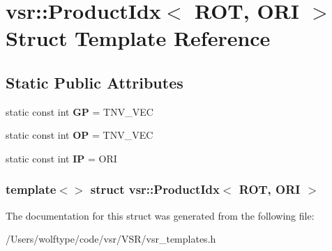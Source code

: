 \hypertarget{structvsr_1_1_product_idx_3_01_r_o_t_00_01_o_r_i_01_4}{\section{vsr\-:\-:Product\-Idx$<$ R\-O\-T, O\-R\-I $>$ Struct Template Reference}
\label{structvsr_1_1_product_idx_3_01_r_o_t_00_01_o_r_i_01_4}
}
\subsection*{Static Public Attributes}
\begin{DoxyCompactItemize}
\item 
\hypertarget{structvsr_1_1_product_idx_3_01_r_o_t_00_01_o_r_i_01_4_a5938317e6884e8f5bb09b331730cec15}{static const int {\bfseries G\-P} = T\-N\-V\-\_\-\-V\-E\-C}\label{structvsr_1_1_product_idx_3_01_r_o_t_00_01_o_r_i_01_4_a5938317e6884e8f5bb09b331730cec15}

\item 
\hypertarget{structvsr_1_1_product_idx_3_01_r_o_t_00_01_o_r_i_01_4_ab388d18766a4896fed93170225a08b6d}{static const int {\bfseries O\-P} = T\-N\-V\-\_\-\-V\-E\-C}\label{structvsr_1_1_product_idx_3_01_r_o_t_00_01_o_r_i_01_4_ab388d18766a4896fed93170225a08b6d}

\item 
\hypertarget{structvsr_1_1_product_idx_3_01_r_o_t_00_01_o_r_i_01_4_adfdaf2c886202369674fd2ce501c842d}{static const int {\bfseries I\-P} = O\-R\-I}\label{structvsr_1_1_product_idx_3_01_r_o_t_00_01_o_r_i_01_4_adfdaf2c886202369674fd2ce501c842d}

\end{DoxyCompactItemize}
\subsubsection*{template$<$$>$ struct vsr\-::\-Product\-Idx$<$ R\-O\-T, O\-R\-I $>$}



The documentation for this struct was generated from the following file\-:\begin{DoxyCompactItemize}
\item 
/\-Users/wolftype/code/vsr/\-V\-S\-R/vsr\-\_\-templates.\-h\end{DoxyCompactItemize}
